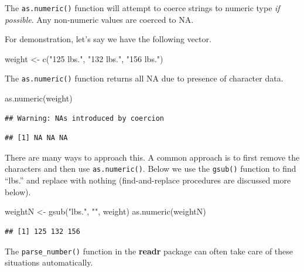 \documentclass[
]{book}
\newenvironment{Shaded}{\begin{snugshade}}{\end{snugshade}}
\newcommand{\FunctionTok}[1]{\textcolor[rgb]{0.00,0.00,0.00}{#1}}
\newcommand{\NormalTok}[1]{#1}
\newcommand{\OtherTok}[1]{\textcolor[rgb]{0.56,0.35,0.01}{#1}}
\newcommand{\StringTok}[1]{\textcolor[rgb]{0.31,0.60,0.02}{#1}}
\begin{document}
The \texttt{as.numeric()} function will attempt to coerce strings to numeric type \emph{if possible}. Any non-numeric values are coerced to NA.

For demonstration, let's say we have the following vector.

\begin{Shaded}
\begin{Highlighting}[]
\NormalTok{weight }\OtherTok{\textless{}{-}} \FunctionTok{c}\NormalTok{(}\StringTok{"125 lbs."}\NormalTok{, }\StringTok{"132 lbs."}\NormalTok{, }\StringTok{"156 lbs."}\NormalTok{)}
\end{Highlighting}
\end{Shaded}

The \texttt{as.numeric()} function returns all NA due to presence of character data.

\begin{Shaded}
\begin{Highlighting}[]
\FunctionTok{as.numeric}\NormalTok{(weight)}
\end{Highlighting}
\end{Shaded}

\begin{verbatim}
## Warning: NAs introduced by coercion
\end{verbatim}

\begin{verbatim}
## [1] NA NA NA
\end{verbatim}

There are many ways to approach this. A common approach is to first remove the characters and then use \texttt{as.numeric()}. Below we use the \texttt{gsub()} function to find ``lbs.'' and replace with nothing (find-and-replace procedures are discussed more below).

\begin{Shaded}
\begin{Highlighting}[]
\NormalTok{weightN }\OtherTok{\textless{}{-}} \FunctionTok{gsub}\NormalTok{(}\StringTok{"lbs."}\NormalTok{, }\StringTok{""}\NormalTok{, weight)}
\FunctionTok{as.numeric}\NormalTok{(weightN)}
\end{Highlighting}
\end{Shaded}

\begin{verbatim}
## [1] 125 132 156
\end{verbatim}

The \texttt{parse\_number()} function in the \textbf{readr} package can often take care of these situations automatically.
\end{document}
